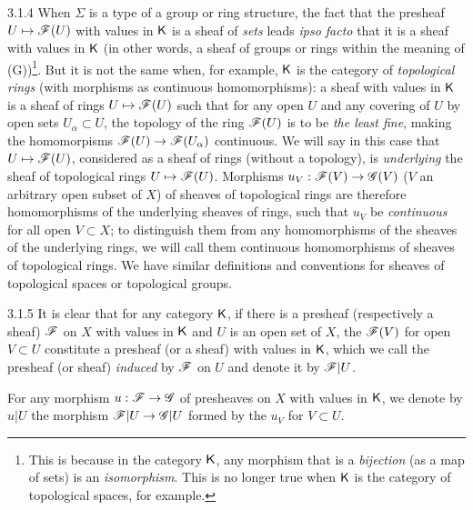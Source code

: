 \documentclass[10pt,oneside]{book}
\begin{document}
\begin{env}{3.1.4}
\label{env-0.3.1.4}
When $\Sigma$ is a type of a group or ring structure, the fact that the presheaf
$U\mapsto\mathscr{F}(U)$ with values in $\mathsf{K}$ is a sheaf of \emph{sets} leads \emph{ipso facto}
that it is a sheaf with values in $\mathsf{K}$ (in other words, a sheaf of groups or rings within the
meaning of (G))\footnote{This is because in the category $\mathsf{K}$, any morphism that is a
\emph{bijection} (as a map of sets) is an \emph{isomorphism}. This is no longer true when
$\mathsf{K}$ is the category of topological spaces, for example.}. But it is not the same when, for
example, $\mathsf{K}$ is the category of \emph{topological rings} (with morphisms as continuous
homomorphisms): a sheaf with values in $\mathsf{K}$ is a sheaf of rings $U\mapsto\mathscr{F}(U)$ such that
for any open $U$ and any covering of $U$ by open sets $U_\alpha\subset U$, the topology of
the ring $\mathscr{F}(U)$ is to be \emph{the least fine}, making the homomorpisms
$\mathscr{F}(U)\to\mathscr{F}(U_\alpha)$ continuous. We will say in this case that $U\mapsto\mathscr{F}(U)$,
considered as a sheaf of rings (without a topology), is \emph{underlying} the sheaf of
topological rings $U\mapsto\mathscr{F}(U)$. Morphisms $u_V:\mathscr{F}(V)\to\mathscr{G}(V)$ ($V$ an
arbitrary open subset of $X$) of sheaves of topological rings are therefore homomorphisms of
the underlying sheaves of rings, such that $u_V$ be \emph{continuous} for all open
$V\subset X$; to distinguish them from any homomorphisms of the sheaves of the underlying
rings, we will call them continuous homomorphisms of sheaves of topological rings. We have
similar definitions and conventions for sheaves of topological spaces or topological groups.
\end{env}

\begin{env}{3.1.5}
\label{env-0.3.1.5}
It is clear that for any category $\mathsf{K}$, if there is a presheaf (respectively a sheaf)
$\mathscr{F}$ on $X$ with values in $\mathsf{K}$ and $U$ is an open set of $X$, the $\mathscr{F}(V)$ for open
$V\subset U$ constitute a presheaf (or a sheaf) with values in $\mathsf{K}$, which we call the
presheaf (or sheaf) \emph{induced} by $\mathscr{F}$ on $U$ and denote it by $\mathscr{F}|U$.

For any morphism $u:\mathscr{F}\to\mathscr{G}$ of presheaves on $X$ with values in $\mathsf{K}$, we denote by
$u|U$ the morphism $\mathscr{F}|U\to\mathscr{G}|U$ formed by the $u_V$ for $V\subset U$.
\end{env}
\end{document}
